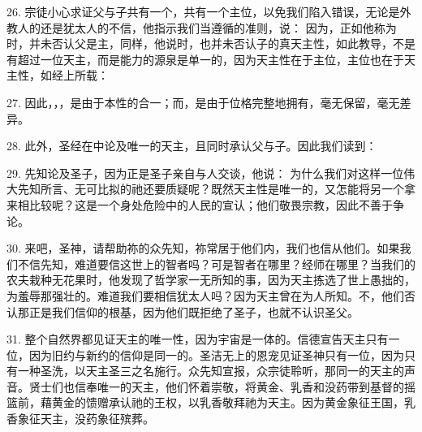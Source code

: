 26. 宗徒小心求证父与子共有一个，共有一个主位，以免我们陷入错误，无论是外教人的还是犹太人的不信，他指示我们当遵循的准则，说： 因为，正如他称为时，并未否认父是主，同样，他说时，也并未否认子的真天主性，如此教导，不是有超过一位天主，而是能力的源泉是单一的，因为天主性在于主位，主位也在于天主性，如经上所载：\par

27. 因此，，，是由于本性的合一；而，是由于位格完整地拥有，毫无保留，毫无差异。\par

28. 此外，圣经在中论及唯一的天主，且同时承认父与子。因此我们读到：\par

29. 先知论及圣子，因为正是圣子亲自与人交谈，他说： 为什么我们对这样一位伟大先知所言、无可比拟的祂还要质疑呢？既然天主性是唯一的，又怎能将另一个拿来相比较呢？这是一个身处危险中的人民的宣认；他们敬畏宗教，因此不善于争论。\par

30. 来吧，圣神，请帮助祢的众先知，祢常居于他们内，我们也信从他们。如果我们不信先知，难道要信这世上的智者吗？可是智者在哪里？经师在哪里？当我们的农夫栽种无花果时，他发现了哲学家一无所知的事，因为天主拣选了世上愚拙的，为羞辱那强壮的。难道我们要相信犹太人吗？因为天主曾在为人所知。不，他们否认那正是我们信仰的根基，因为他们既拒绝了圣子，也就不认识圣父。\par

\par

31. 整个自然界都见证天主的唯一性，因为宇宙是一体的。信德宣告天主只有一位，因为旧约与新约的信仰是同一的。圣洁无上的恩宠见证圣神只有一位，因为只有一种圣洗，以天主圣三之名施行。众先知宣报，众宗徒聆听，那同一的天主的声音。贤士们也信奉唯一的天主，他们怀着崇敬，将黄金、乳香和没药带到基督的摇篮前，藉黄金的馈赠承认祂的王权，以乳香敬拜祂为天主。因为黄金象征王国，乳香象征天主，没药象征殡葬。\par

